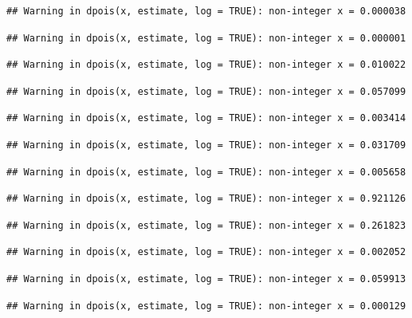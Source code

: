 \documentclass[]{article}
\begin{document}
\begin{verbatim}
## Warning in dpois(x, estimate, log = TRUE): non-integer x = 0.000038
\end{verbatim}

\begin{verbatim}
## Warning in dpois(x, estimate, log = TRUE): non-integer x = 0.000001
\end{verbatim}

\begin{verbatim}
## Warning in dpois(x, estimate, log = TRUE): non-integer x = 0.010022
\end{verbatim}

\begin{verbatim}
## Warning in dpois(x, estimate, log = TRUE): non-integer x = 0.057099
\end{verbatim}

\begin{verbatim}
## Warning in dpois(x, estimate, log = TRUE): non-integer x = 0.003414
\end{verbatim}

\begin{verbatim}
## Warning in dpois(x, estimate, log = TRUE): non-integer x = 0.031709
\end{verbatim}

\begin{verbatim}
## Warning in dpois(x, estimate, log = TRUE): non-integer x = 0.005658
\end{verbatim}

\begin{verbatim}
## Warning in dpois(x, estimate, log = TRUE): non-integer x = 0.921126
\end{verbatim}

\begin{verbatim}
## Warning in dpois(x, estimate, log = TRUE): non-integer x = 0.261823
\end{verbatim}

\begin{verbatim}
## Warning in dpois(x, estimate, log = TRUE): non-integer x = 0.002052
\end{verbatim}

\begin{verbatim}
## Warning in dpois(x, estimate, log = TRUE): non-integer x = 0.059913
\end{verbatim}

\begin{verbatim}
## Warning in dpois(x, estimate, log = TRUE): non-integer x = 0.000129
\end{verbatim}
\end{document}
